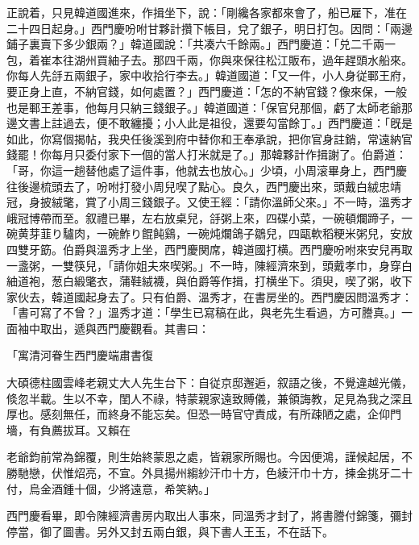 正說着，只見韓道國進來，作揖坐下，說：「剛纔各家都來會了，船已雇下，准在二十四日起身。」西門慶吩咐甘夥計攢下帳目，兌了銀子，明日打包。因問：「兩邊鋪子裏賣下多少銀兩？」韓道國說：「共凑六千餘兩。」西門慶道：「兑二千兩一包，着崔本往湖州買紬子去。那四千兩，你與來保往松江販布，過年趕頭水船來。你每人先㧱五兩銀子，家中收拾行李去。」韓道國道：「又一件，小人身従鄆王府，要正身上直，不納官錢，如何處置？」西門慶道：「怎的不納官錢？像來保，一般也是鄆王差事，他每月只納三錢銀子。」韓道國道：「保官兒那個，虧了太師老爺那邊文書上註過去，便不敢纏擾；小人此是祖役，還要勾當餘丁。」西門慶道：「旣是如此，你寫個揭帖，我央任後溪到府中替你和王奉承說，把你官身註銷，常遠納官錢罷！你每月只委付家下一個的當人打米就是了。」那韓夥計作揖謝了。伯爵道：「哥，你這一趟替他處了這件事，他就去也放心。」少頃，小周滚畢身上，西門慶往後邊梳頭去了，吩咐打發小周兒喫了點心。良久，西門慶出來，頭戴白絨忠靖冠，身披絨氅，賞了小周三錢銀子。又使王經：「請你溫師父來。」不一時，溫秀才峨冠博帶而至。叙禮已畢，左右放桌兒，㧱粥上來，四碟小菜，一碗頓爛蹄子，一碗黄芽韮り驢肉，一碗鮓り餛飩鷄，一碗炖爛鴿子鶵兒，四甌軟稻粳米粥兒，安放四雙牙筯。伯爵與溫秀才上坐，西門慶関席，韓道國打横。西門慶吩咐來安兒再取一盞粥，一雙筷兒，「請你姐夫來喫粥。」不一時，陳經濟來到，頭戴孝巾，身穿白紬道袍，葱白緞氅衣，蒲鞋絨襪，與伯爵等作揖，打横坐下。須臾，喫了粥，收下家伙去，韓道國起身去了。只有伯爵、溫秀才，在書房坐的。西門慶因問溫秀才：「書可寫了不曾？」溫秀才道：「學生已寫稿在此，與老先生看過，方可謄真。」一面袖中取出，遞與西門慶觀看。其書曰：

「寓清河眷生西門慶端肅書復

大碩德柱國雲峰老親丈大人先生台下：自従京邸邂逅，叙語之後，不覺違越光儀，倐忽半載。生以不幸，閨人不祿，特蒙親家遠致賻儀，兼領誨教，足見為我之深且厚也。感刻無任，而終身不能忘矣。但恐一時官守責成，有所疎陋之處，企仰門墻，有負薦拔耳。又賴在

老爺鈞前常為錦覆，則生始終蒙恩之處，皆親家所賜也。今因便鴻，謹候起居，不勝馳戀，伏惟炤亮，不宣。外具揚州縐紗汗巾十方，色綾汗巾十方，揀金挑牙二十付，烏金酒鍾十個，少將遠意，希笑納。」

西門慶看畢，即令陳經濟書房内取出人事來，同溫秀才封了，將書謄付錦箋，彌封停當，御了圖書。另外又封五兩白銀，與下書人王玉，不在話下。

